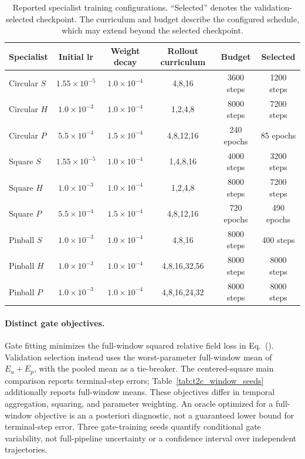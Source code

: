 \par
\begin{table}[H]
\centering
\caption{
Reported specialist training configurations. ``Selected'' denotes the validation-selected checkpoint. The curriculum and budget describe the configured schedule, which may extend beyond the selected checkpoint.
}
\label{tab:specialist_training}
\small
\setlength{\tabcolsep}{3.5pt}
\begin{tabular}{@{}lccccc@{}}
\toprule
Specialist & Initial lr & Weight decay & Rollout curriculum & Budget & Selected \\
\midrule
Circular $S$
& $1.55{\times}10^{-5}$ & $1.0{\times}10^{-4}$
& 4,8,16 & 3600 steps & 1200 steps \\
Circular $H$
& $1.0{\times}10^{-3}$ & $1.0{\times}10^{-4}$
& 1,2,4,8 & 8000 steps & 7200 steps \\
Circular $P$
& $5.5{\times}10^{-4}$ & $1.5{\times}10^{-4}$
& 4,8,12,16 & 240 epochs & 85 epochs \\
\addlinespace
Square $S$
& $1.55{\times}10^{-5}$ & $1.0{\times}10^{-4}$
& 1,4,8,16 & 4000 steps & 3200 steps \\
Square $H$
& $1.0{\times}10^{-3}$ & $1.0{\times}10^{-4}$
& 1,2,4,8 & 8000 steps & 7200 steps \\
Square $P$
& $5.5{\times}10^{-4}$ & $1.5{\times}10^{-4}$
& 4,8,12,16 & 720 epochs & 490 epochs \\
\addlinespace
Pinball $S$
& $1.0{\times}10^{-3}$ & $1.0{\times}10^{-4}$
& 4,8,16 & 8000 steps & 400 steps \\
Pinball $H$
& $1.0{\times}10^{-3}$ & $1.0{\times}10^{-4}$
& 4,8,16,32,56 & 8000 steps & 8000 steps \\
Pinball $P$
& $1.0{\times}10^{-3}$ & $1.0{\times}10^{-4}$
& 4,8,16,24,32 & 8000 steps & 8000 steps \\
\bottomrule
\end{tabular}
\end{table}
\par

\paragraph{Distinct gate objectives.}
Gate fitting minimizes the full-window squared relative field loss in Eq.~(). Validation selection instead uses the worst-parameter full-window mean of $E_u+E_p$, with the pooled mean as a tie-breaker. The centered-square main comparison reports terminal-step errors; Table~\ref{tab:t2c_window_seeds} additionally reports full-window means. These objectives differ in temporal aggregation, squaring, and parameter weighting. An oracle optimized for a full-window objective is an a posteriori diagnostic, not a guaranteed lower bound for terminal-step error. Three gate-training seeds quantify conditional gate variability, not full-pipeline uncertainty or a confidence interval over independent trajectories.


